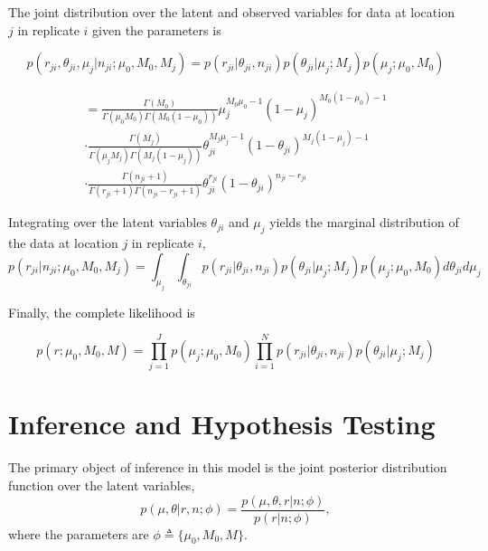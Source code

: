 \documentclass[11pt,reqno]{amsart}
\begin{document}
The joint distribution over the latent and observed variables for data at location $j$ in replicate $i$ given the parameters is

\begin{equation}\label{eqn:jointpdf}
p \left( r_{ji}, \theta_{ji}, \mu_j | n_{ji}; \mu_0, M_0, M_j \right) = p \left( r_{ji} | \theta_{ji}, n_{ji} \right) p\left( \theta_{ji} | \mu_j; M_j \right) p\left( \mu_j; \mu_0, M_0 \right)
\end{equation}

\begin{gather}
= \frac{ \Gamma(M_0) } { \Gamma(\mu_0 M_0) \Gamma(M_0 (1-\mu_0)) } \mu_j^{M_0\mu_0 -1} (1 - \mu_j)^{M_0 ( 1 - \mu_0) - 1} \\
\cdot \frac{ \Gamma(M_j) } { \Gamma(\mu_j M_j) \Gamma(M_j (1-\mu_j)) } \theta_{ji}^{M_j\mu_j -1} (1 - \theta_{ji})^{M_j ( 1 - \mu_j) - 1} \\
\cdot \frac{ \Gamma(n_{ji}+1) } { \Gamma(r_{ji}+1) \Gamma( n_{ji} - r_{ji} + 1 ) } \theta_{ji}^{r_{ji}} (1 - \theta_{ji})^{n_{ji} - r_{ji}}
\end{gather}

Integrating over the latent variables $\theta_{ji}$ and $\mu_j$ yields the marginal distribution of the data at location $j$ in replicate $i$, 
\begin{equation}
p \left( r_{ji} | n_{ji} ; \mu_0, M_0, M_j \right) = \int_{\mu_j} \int_{\theta_{ji}}  p \left( r_{ji} | \theta_{ji}, n_{ji} \right) p\left( \theta_{ji} | \mu_j; M_j \right) p\left( \mu_j; \mu_0, M_0 \right) d\theta_{ji} d\mu_j
\end{equation}

Finally, the complete likelihood is

\begin{equation}
p \left( r ; \mu_0, M_0, M \right) = \prod_{j=1}^J p\left( \mu_j; \mu_0, M_0 \right) \prod_{i=1}^N p \left( r_{ji} | \theta_{ji}, n_{ji} \right) p\left( \theta_{ji} | \mu_j; M_j \right) 
\end{equation}

\section{Inference and Hypothesis Testing}

The primary object of inference in this model is the joint posterior distribution function over the latent variables,
\begin{equation}
	p(\mu, \theta | r, n; \phi)  = \frac{ p(\mu, \theta, r | n; \phi) } {p ( r | n; \phi)},
\end{equation}
where the parameters are $\phi \triangleq \{\mu_0, M_0, M\}$.
\end{document}
